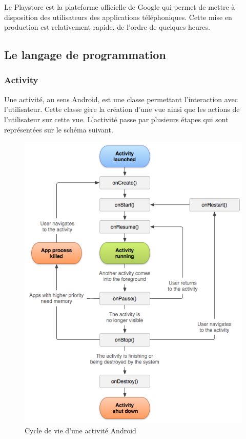 Le Playstore est la plateforme officielle de Google qui permet de mettre à disposition des utilisateurs des applications téléphoniques. Cette mise en production est relativement rapide, de l'ordre de quelques heures.

\subsection{Le langage de programmation}

\subsubsection{Activity}

Une activité, au sens Android, est une classe permettant l’interaction avec l'utilisateur. Cette classe gère la création d'une vue ainsi que les actions de l'utilisateur sur cette vue. L'activité passe par plusieurs étapes qui sont représentées sur le schéma suivant.

\begin{figure}[!h]
	\centering
	\includegraphics[scale=0.6]{img/activity_lifecycle.png}
	\caption{\label{activity_lifecycle} Cycle de vie d'une activité Android}
\end{figure}

